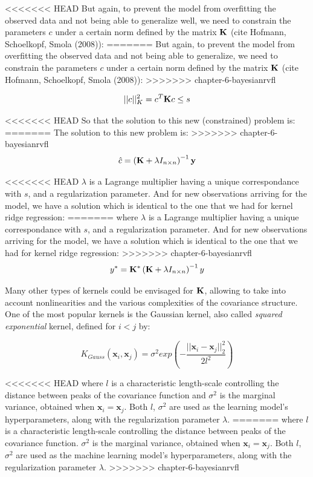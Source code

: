 <<<<<<< HEAD
But again, to prevent the model from overfitting the observed data and not being able to generalize well, we need to constrain the parameters $c$ under a certain norm defined by the matrix ${\bf K}$ (cite Hofmann, Schoelkopf, Smola (2008)):
=======
But again, to prevent the model from overfitting the observed data and not being able to generalize, we need to constrain the parameters $c$ under a certain norm defined by the matrix ${\bf K}$ (cite Hofmann, Schoelkopf, Smola (2008)):
>>>>>>> chapter-6-bayesianrvfl

$$
||c||^2_K = c^T {\bf K}  c  \leq s
$$

<<<<<<< HEAD
So that the solution to this new (constrained) problem is:
=======
The solution to this new problem is:
>>>>>>> chapter-6-bayesianrvfl
$$
\hat{c} = \left( {\bf K}  + \lambda I_{n \times n} \right)^{-1}{\bf y}\\
$$

<<<<<<< HEAD
$\lambda$ is a Lagrange multiplier having a unique correspondance with $s$, and a regularization parameter. And for new observations arriving for the model, we have a solution which is identical to the one that we had for kernel ridge regression:
=======
where $\lambda$ is a Lagrange multiplier having a unique correspondance with $s$, and a regularization parameter. And for new observations arriving for the model, we have a solution which is identical to the one that we had for kernel ridge regression:
>>>>>>> chapter-6-bayesianrvfl
$$
y^* =  {\bf K^*} \left( {\bf K} + \lambda I_{n \times n} \right)^{-1} y
$$


\medskip

Many other types of kernels could be envisaged for ${\bf K}$, allowing to take into account nonlinearities and the various complexities of the covariance structure. One of the most popular kernels is the Gaussian kernel, also called \textit{squared exponential} kernel, defined for $i < j$ by:

\medskip

$$
K_{Gauss}(\textbf{x}_i, \textbf{x}_j) = \sigma^2 exp \left( -\frac{||\textbf{x}_i - \textbf{x}_j||^2_2}{2l^2} \right)
$$

<<<<<<< HEAD
where $l$ is a characteristic length-scale controlling the distance between peaks of the covariance function and $\sigma^2$ is the marginal variance, obtained when $\textbf{x}_i = \textbf{x}_j$. Both $l$, $\sigma^2$ are used as the learning model's hyperparameters, along with the regularization parameter $\lambda$.
=======
where $l$ is a characteristic length-scale controlling the distance between peaks of the covariance function. $\sigma^2$ is the marginal variance, obtained when $\textbf{x}_i = \textbf{x}_j$. Both $l$, $\sigma^2$ are used as the machine learning model's hyperparameters, along with the regularization parameter $\lambda$.
>>>>>>> chapter-6-bayesianrvfl

